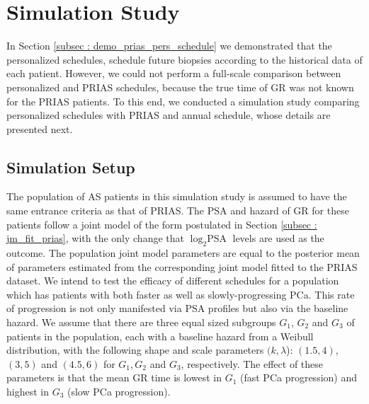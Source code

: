 \section{Simulation Study}
\label{sec: simulation_study}
In Section \ref{subsec : demo_prias_pers_schedule} we demonstrated that the personalized schedules, schedule future biopsies according to the historical data of each patient. However, we could not perform a full-scale comparison between personalized and PRIAS schedules, because the true time of GR was not known for the PRIAS patients. To this end, we conducted a simulation study comparing personalized schedules with PRIAS and annual schedule, whose details are presented next.

\subsection{Simulation Setup}
\label{subsec : simulation_setup}
The population of AS patients in this simulation study is assumed to have the same entrance criteria as that of PRIAS. The PSA and hazard of GR for these patients follow a joint model of the form postulated in Section \ref{subsec : jm_fit_prias}, with the only change that $\log_2 \mbox{PSA}$ levels are used as the outcome. The population joint model parameters are equal to the posterior mean of parameters estimated from the corresponding joint model fitted to the PRIAS dataset. We intend to test the efficacy of different schedules for a population which has patients with both faster as well as slowly-progressing PCa. This rate of progression is not only manifested via PSA profiles but also via the baseline hazard. We assume that there are three equal sized subgroups $G_1$, $G_2$ and $G_3$ of patients in the population, each with a baseline hazard from a Weibull distribution, with the following shape and scale parameters $(k, \lambda$): $(1.5, 4)$, $(3, 5)$ and $(4.5, 6)$ for $G_1, G_2$ and $G_3$, respectively. The effect of these parameters is that the mean GR time is lowest in $G_1$ (fast PCa progression) and highest in $G_3$ (slow PCa progression).

